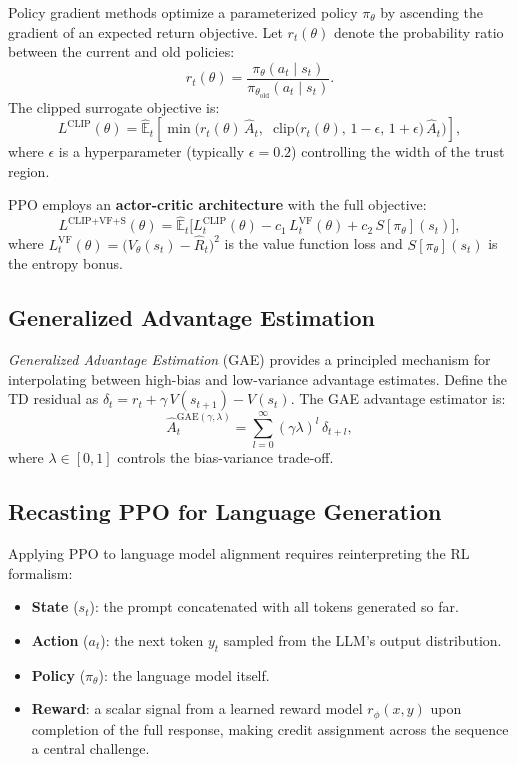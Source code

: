 \documentclass[12pt,a4paper]{report}
\theoremstyle{definition}
\begin{document}
Policy gradient methods optimize a parameterized policy $\pi_\theta$ by ascending the gradient of an expected return objective. Let $r_t(\theta)$ denote the probability ratio between the current and old policies:
\begin{equation}
    r_t(\theta) = \frac{\pi_\theta(a_t \mid s_t)}{\pi_{\theta_{\text{old}}}(a_t \mid s_t)}.
\end{equation}
The clipped surrogate objective is:
\begin{equation}
    \label{eq:ppo_clip}
    L^{\text{CLIP}}(\theta) = \hat{\mathbb{E}}_t \left[ \min\!\Big( r_t(\theta) \, \hat{A}_t, \;\; \text{clip}\!\big(r_t(\theta),\, 1-\epsilon,\, 1+\epsilon\big) \, \hat{A}_t \Big) \right],
\end{equation}
where $\epsilon$ is a hyperparameter (typically $\epsilon = 0.2$) controlling the width of the trust region.

PPO employs an \textbf{actor-critic architecture} with the full objective:
\begin{equation}
    L^{\text{CLIP+VF+S}}(\theta) = \hat{\mathbb{E}}_t \Big[ L_t^{\text{CLIP}}(\theta) - c_1 \, L_t^{\text{VF}}(\theta) + c_2 \, S[\pi_\theta](s_t) \Big],
\end{equation}
where $L_t^{\text{VF}}(\theta) = \big(V_\theta(s_t) - \hat{R}_t\big)^2$ is the value function loss and $S[\pi_\theta](s_t)$ is the entropy bonus.

\subsection{Generalized Advantage Estimation}

\emph{Generalized Advantage Estimation} (GAE) provides a principled mechanism for interpolating between high-bias and low-variance advantage estimates. Define the TD residual as $\delta_t = r_t + \gamma \, V(s_{t+1}) - V(s_t)$. The GAE advantage estimator is:
\begin{equation}
    \label{eq:gae}
    \hat{A}_t^{\text{GAE}(\gamma, \lambda)} = \sum_{l=0}^{\infty} (\gamma \lambda)^l \, \delta_{t+l},
\end{equation}
where $\lambda \in [0,1]$ controls the bias-variance trade-off.

\subsection{Recasting PPO for Language Generation}

Applying PPO to language model alignment requires reinterpreting the RL formalism:
\begin{itemize}
    \item \textbf{State} ($s_t$): the prompt concatenated with all tokens generated so far.
    \item \textbf{Action} ($a_t$): the next token $y_t$ sampled from the LLM's output distribution.
    \item \textbf{Policy} ($\pi_\theta$): the language model itself.
    \item \textbf{Reward}: a scalar signal from a learned reward model $r_\phi(x, y)$ upon completion of the full response, making credit assignment across the sequence a central challenge.
\end{itemize}
\end{document}

